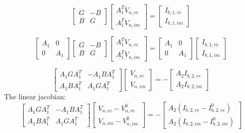\documentclass{book}
\begin{document}
\begin{equation}
\begin{bmatrix}
G&-B\\
B&G
\end{bmatrix}
\begin{bmatrix}
A_{1}^{T}V_{n,re}\\
A_{1}^{T}V_{n,im}
\end{bmatrix}
=
\begin{bmatrix}
I_{b,1,re}\\
I_{b,1,im}
\end{bmatrix}
\end{equation}


\begin{equation}
\begin{bmatrix}
A_1&0\\
0&A_1
\end{bmatrix}
\begin{bmatrix}
G&-B\\
B&G
\end{bmatrix}
\begin{bmatrix}
A_{1}^{T}V_{n,re}\\
A_{1}^{T}V_{n,im}
\end{bmatrix}
=
\begin{bmatrix}
A_1&0\\
0&A_1
\end{bmatrix}
\begin{bmatrix}
I_{b,1,re}\\
I_{b,1,im}
\end{bmatrix}
\end{equation}

\begin{equation}
\begin{bmatrix}
A_1GA_1^{T}&-A_1BA_1^{T}\\
A_1BA_1^{T}&A_1GA_1^{T}
\end{bmatrix}
\begin{bmatrix}
V_{n,re}\\
V_{n,im}
\end{bmatrix}
=-
\begin{bmatrix}
A_2I_{b,2,re}\\
A_2I_{b,2,im}
\end{bmatrix}
\end{equation}
The linear jacobian:
\begin{equation}
\begin{bmatrix}
A_1GA_1^{T}&-A_1BA_1^{T}\\
A_1BA_1^{T}&A_1GA_1^{T}
\end{bmatrix}
\begin{bmatrix}
V_{n,re}-V_{n,re}^{0}\\
V_{n,im}-V_{n,im}^{0}
\end{bmatrix}
=-
\begin{bmatrix}
A_2(I_{b,2,re}-I_{b,2,re}^{0})\\
A_2(I_{b,2,im}-I_{b,2,im}^{0})
\end{bmatrix}
\end{equation}
\end{document}
